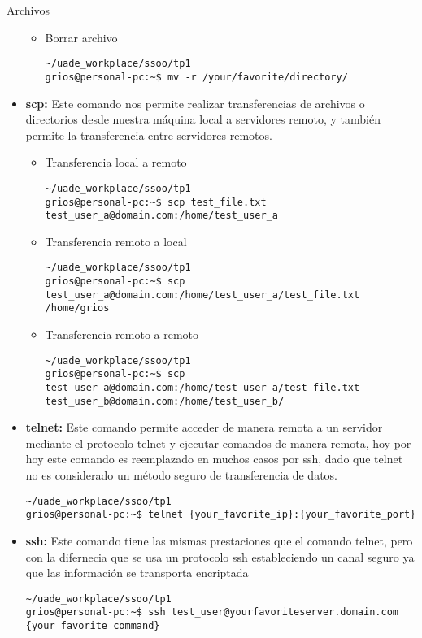 \begin{section}{Archivos}
\begin{itemize}
\begin{itemize}
\item Borrar archivo
\begin{lstlisting}[style=Ubuntu]
~/uade_workplace/ssoo/tp1
grios@personal-pc:~$ mv -r /your/favorite/directory/
\end{lstlisting}

\end{itemize}


\item \textbf{scp:}
Este comando nos permite realizar transferencias de archivos o directorios desde nuestra máquina local a servidores remoto, y también permite la transferencia entre servidores remotos.

\begin{itemize}
\item Transferencia local a remoto
\begin{lstlisting}[style=Ubuntu]
~/uade_workplace/ssoo/tp1
grios@personal-pc:~$ scp test_file.txt test_user_a@domain.com:/home/test_user_a
\end{lstlisting}

\item Transferencia remoto a local
\begin{lstlisting}[style=Ubuntu]
~/uade_workplace/ssoo/tp1
grios@personal-pc:~$ scp test_user_a@domain.com:/home/test_user_a/test_file.txt /home/grios
\end{lstlisting}

\item Transferencia remoto a remoto
\begin{lstlisting}[style=Ubuntu]
~/uade_workplace/ssoo/tp1
grios@personal-pc:~$ scp test_user_a@domain.com:/home/test_user_a/test_file.txt test_user_b@domain.com:/home/test_user_b/
\end{lstlisting}

\end{itemize}

\item \textbf{telnet:}
Este comando permite acceder de manera remota a un servidor mediante el protocolo telnet y ejecutar comandos de manera remota, hoy por hoy este comando es reemplazado en muchos casos por ssh, dado que telnet no es considerado un método seguro de transferencia de datos.
\begin{lstlisting}[style=Ubuntu]
~/uade_workplace/ssoo/tp1
grios@personal-pc:~$ telnet {your_favorite_ip}:{your_favorite_port}
\end{lstlisting}

\item \textbf{ssh:}
Este comando tiene las mismas prestaciones que el comando telnet, pero con la difernecia que se usa un protocolo ssh estableciendo un canal seguro ya que las información se transporta encriptada
\begin{lstlisting}[style=Ubuntu]
~/uade_workplace/ssoo/tp1
grios@personal-pc:~$ ssh test_user@yourfavoriteserver.domain.com {your_favorite_command}
\end{lstlisting}


\end{itemize}
\end{section}
